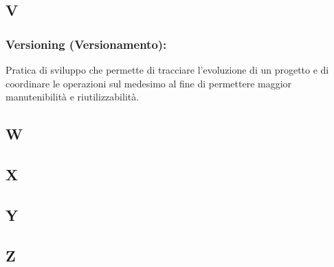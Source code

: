 \subsection*{\huge{V}}
\subsubsection*{Versioning (Versionamento):} Pratica di sviluppo che permette di
tracciare l'evoluzione di un progetto e di coordinare le operazioni sul
medesimo al fine di permettere maggior manutenibilit\`a e riutilizzabilit\`a.
\subsection*{\huge{W}}
\subsection*{\huge{X}}
\subsection*{\huge{Y}}
\subsection*{\huge{Z}}






